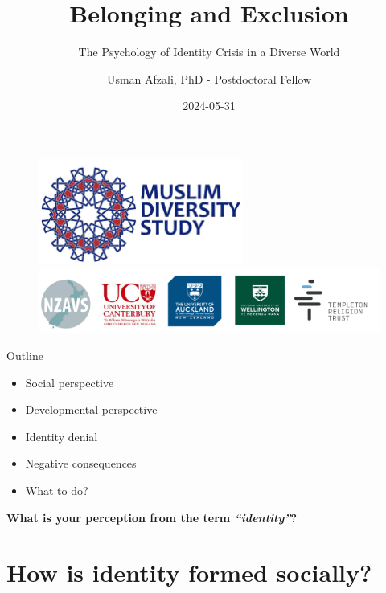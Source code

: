 \documentclass[
  ignorenonframetext,
  aspectratio=169,
]{beamer}
\title{Belonging and Exclusion}
\subtitle{The Psychology of Identity Crisis in a Diverse World}
\author{Usman Afzali, PhD - Postdoctoral Fellow}
\date{2024-05-31}
\institute{University of Canterbury}
\providecommand{\tightlist}{%
  \setlength{\itemsep}{0pt}\setlength{\parskip}{0pt}}\usepackage{longtable,booktabs,array}
\begin{document}
\frame{\titlepage}

\begin{frame}
\begin{figure}

\begin{minipage}{\linewidth}
\begin{center}
\includegraphics[width=0.6\textwidth,height=\textheight]{figs/mds.png}
\end{center}
\includegraphics{figs/sponsors.png}\end{minipage}%

\end{figure}%
\end{frame}

\begin{frame}{Outline}
\label{outline}
\begin{itemize}
\tightlist
\item
  Social perspective
\item
  Developmental perspective
\item
  Identity denial
\item
  Negative consequences
\item
  What to do?
\end{itemize}
\end{frame}

\begin{frame}
\textbf{What is your perception from the term \emph{``identity''}?}
\end{frame}

\section{How is identity formed
socially?}\label{how-is-identity-formed-socially}
\end{document}
